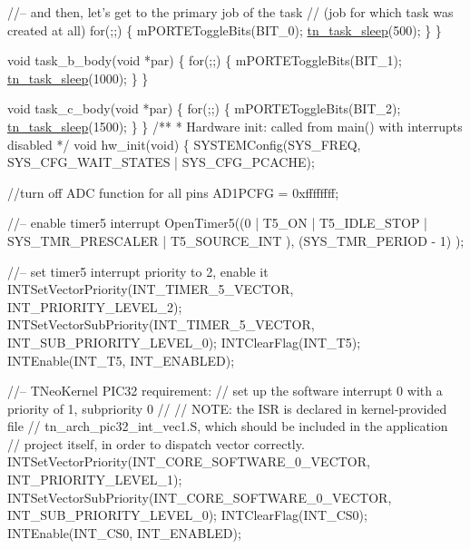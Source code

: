 \begin{DoxyCodeInclude}
   \textcolor{comment}{//-- and then, let's get to the primary job of the task}
   \textcolor{comment}{//   (job for which task was created at all)}
   \textcolor{keywordflow}{for}(;;)
   \{
      mPORTEToggleBits(BIT\_0);
      \hyperlink{tn__tasks_8h_ad3708ae3400f11b98747ad4a1cad88fa}{tn\_task\_sleep}(500);
   \}
\}

\textcolor{keywordtype}{void} task\_b\_body(\textcolor{keywordtype}{void} *par)
\{
   \textcolor{keywordflow}{for}(;;)
   \{
      mPORTEToggleBits(BIT\_1);
      \hyperlink{tn__tasks_8h_ad3708ae3400f11b98747ad4a1cad88fa}{tn\_task\_sleep}(1000);
   \}
\}

\textcolor{keywordtype}{void} task\_c\_body(\textcolor{keywordtype}{void} *par)
\{
   \textcolor{keywordflow}{for}(;;)
   \{
      mPORTEToggleBits(BIT\_2);
      \hyperlink{tn__tasks_8h_ad3708ae3400f11b98747ad4a1cad88fa}{tn\_task\_sleep}(1500);
   \}
\}
\textcolor{comment}{}
\textcolor{comment}{/**}
\textcolor{comment}{ * Hardware init: called from main() with interrupts disabled}
\textcolor{comment}{ */}
\textcolor{keywordtype}{void} hw\_init(\textcolor{keywordtype}{void})
\{
   SYSTEMConfig(SYS\_FREQ, SYS\_CFG\_WAIT\_STATES | SYS\_CFG\_PCACHE);

   \textcolor{comment}{//turn off ADC function for all pins}
   AD1PCFG = 0xffffffff;

   \textcolor{comment}{//-- enable timer5 interrupt}
   OpenTimer5((0
            | T5\_ON
            | T5\_IDLE\_STOP
            | SYS\_TMR\_PRESCALER
            | T5\_SOURCE\_INT
            ),
         (SYS\_TMR\_PERIOD - 1)
         );

   \textcolor{comment}{//-- set timer5 interrupt priority to 2, enable it}
   INTSetVectorPriority(INT\_TIMER\_5\_VECTOR, INT\_PRIORITY\_LEVEL\_2);
   INTSetVectorSubPriority(INT\_TIMER\_5\_VECTOR, INT\_SUB\_PRIORITY\_LEVEL\_0);
   INTClearFlag(INT\_T5);
   INTEnable(INT\_T5, INT\_ENABLED);

   \textcolor{comment}{//-- TNeoKernel PIC32 requirement:}
   \textcolor{comment}{//   set up the software interrupt 0 with a priority of 1, subpriority 0}
   \textcolor{comment}{//}
   \textcolor{comment}{//   NOTE: the ISR is declared in kernel-provided file }
   \textcolor{comment}{//   tn\_arch\_pic32\_int\_vec1.S, which should be included in the application}
   \textcolor{comment}{//   project itself, in order to dispatch vector correctly.}
   INTSetVectorPriority(INT\_CORE\_SOFTWARE\_0\_VECTOR, INT\_PRIORITY\_LEVEL\_1);
   INTSetVectorSubPriority(INT\_CORE\_SOFTWARE\_0\_VECTOR, INT\_SUB\_PRIORITY\_LEVEL\_0);
   INTClearFlag(INT\_CS0);
   INTEnable(INT\_CS0, INT\_ENABLED);


\end{DoxyCodeInclude}
